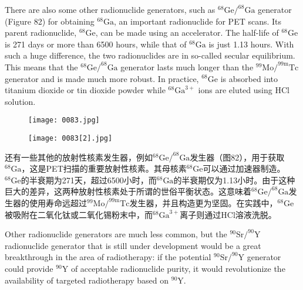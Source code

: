 \documentclass[dvipsnames, svgnames,a4paper,11pt]{article}
\begin{document}
There are also some other radionuclide generators, such as $^{68}\text{Ge}/^{68}\text{Ga}$ generator (Figure 82) for obtaining $^{68}\text{Ga}$, an important radionuclide for PET scans. Its parent radionuclide, $^{68}\text{Ge}$, can be made using an accelerator. The half-life of $^{68}\text{Ge}$ is 271 days or more than 6500 hours, while that of $^{68}\text{Ga}$ is just 1.13 hours. With such a huge difference, the two radionuclides are in so-called secular equilibrium. This means that the $^{68}\text{Ge}/^{68}\text{Ga}$ generator lasts much longer than the $^{99}\text{Mo}/^{99\text{m}}\text{Tc}$ generator and is made much more robust. In practice, $^{68}\text{Ge}$ is absorbed into titanium dioxide or tin dioxide powder while $^{68}\text{Ga}^{3+}$ ions are eluted using HCl solution.


\begin{figure}[ht]
    \centering
    \texttt{[image: 0083.jpg]}
     \label{fig80}
\end{figure}


\begin{figure}[H]
    \centering
    \texttt{[image: 0083[2].jpg]}
     \label{fig81}
\end{figure}

还有一些其他的放射性核素发生器，例如$^{68}\text{Ge}/^{68}\text{Ga}$发生器（图82），用于获取$^{68}\text{Ga}$，这是PET扫描的重要放射性核素。其母核素$^{68}\text{Ge}$可以通过加速器制造。$^{68}\text{Ge}$的半衰期为271天，超过6500小时，而$^{68}\text{Ga}$的半衰期仅为1.13小时。由于这种巨大的差异，这两种放射性核素处于所谓的世俗平衡状态。这意味着$^{68}\text{Ge}/^{68}\text{Ga}$发生器的使用寿命远超过$^{99}\text{Mo}/^{99\text{m}}\text{Tc}$发生器，并且构造更为坚固。在实践中，$^{68}\text{Ge}$被吸附在二氧化钛或二氧化锡粉末中，而$^{68}\text{Ga}^{3+}$离子则通过HCl溶液洗脱。

Other radionuclide generators are much less common, but the $^{90}\text{Sr}/^{90}\text{Y}$ radionuclide generator that is still under development would be a great breakthrough in the area of radiotherapy: if the potential $^{90}\text{Sr}/^{90}\text{Y}$ generator could provide $^{90}\text{Y}$ of acceptable radionuclide purity, it would revolutionize the availability of targeted radiotherapy based on $^{90}\text{Y}$.
\end{document}
